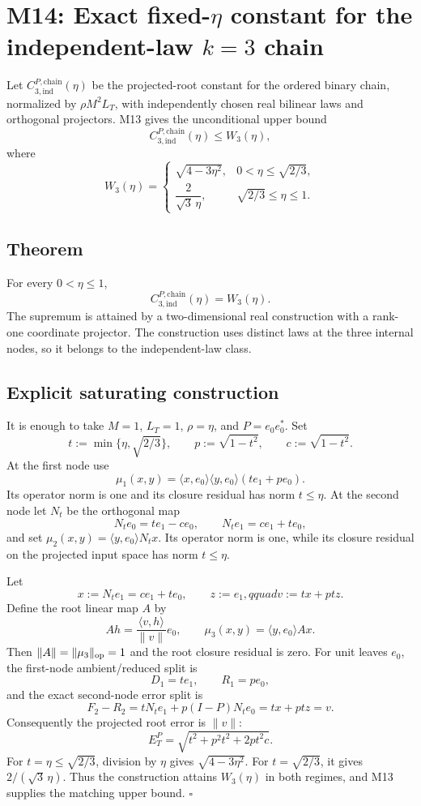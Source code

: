 \section*{M14: Exact fixed-$\eta$ constant for the independent-law $k=3$ chain}
\label{sec:m14-exact-chain}

Let $C_{3,\mathrm{ind}}^{P,\mathrm{chain}}(\eta)$ be the projected-root
constant for the ordered binary chain, normalized by $\rho M^2L_T$, with
independently chosen real bilinear laws and orthogonal projectors. M13 gives
the unconditional upper bound
\[
 C_{3,\mathrm{ind}}^{P,\mathrm{chain}}(\eta)\le W_3(\eta),
\]
where
\[
 W_3(\eta)=
 \begin{cases}
 \sqrt{4-3\eta^2},&0<\eta\le\sqrt{2/3},\\[1mm]
 \dfrac{2}{\sqrt3\,\eta},&\sqrt{2/3}\le\eta\le1.
 \end{cases}
\tag{M14.1}
\]

\subsection*{Theorem}

For every $0<\eta\le1$,
\[
 \boxed{C_{3,\mathrm{ind}}^{P,\mathrm{chain}}(\eta)=W_3(\eta).}
\tag{M14.2}
\]
The supremum is attained by a two-dimensional real construction with a
rank-one coordinate projector. The construction uses distinct laws at the
three internal nodes, so it belongs to the independent-law class.

\subsection*{Explicit saturating construction}

It is enough to take $M=1$, $L_T=1$, $\rho=\eta$, and
$P=e_0e_0^*$. Set
\[
 t:=\min\{\eta,\sqrt{2/3}\},\qquad
 p:=\sqrt{1-t^2},\qquad c:=\sqrt{1-t^2}.
\]
At the first node use
\[
 \mu_1(x,y)=\langle x,e_0\rangle\langle y,e_0\rangle
 (t e_1+p e_0).
\]
Its operator norm is one and its closure residual has norm $t\le\eta$.
At the second node let $N_t$ be the orthogonal map
\[
 N_t e_0=t e_1-c e_0,\qquad
 N_t e_1=c e_1+t e_0,
\]
and set $\mu_2(x,y)=\langle y,e_0\rangle N_t x$. Its operator norm is one,
while its closure residual on the projected input space has norm $t\le\eta$.

Let
\[
 x:=N_t e_1=c e_1+t e_0,\qquad
 z:=e_1,qquad
 v:=t x+p t z.
\]
Define the root linear map $A$ by
\[
 A h=\frac{\langle v,h\rangle}{\|v\|}e_0,
 \qquad \mu_3(x,y)=\langle y,e_0\rangle A x.
\]
Then $\|A\|=\|\mu_3\|_{\rm op}=1$ and the root closure residual is zero.
For unit leaves $e_0$, the first-node ambient/reduced split is
\[
 D_1=t e_1,\qquad R_1=p e_0,
\]
and the exact second-node error split is
\[
 F_2-R_2=tN_t e_1+p(I-P)N_t e_0=t x+p t z=v.
\]
Consequently the projected root error is $\|v\|$:
\[
 E_T^P=\sqrt{t^2+p^2t^2+2pt^2c}.
\tag{M14.3}
\]
For $t=\eta\le\sqrt{2/3}$, division by $\eta$ gives
$\sqrt{4-3\eta^2}$. For $t=\sqrt{2/3}$, it gives
$2/(\sqrt3\,\eta)$. Thus the construction attains $W_3(\eta)$ in both
regimes, and M13 supplies the matching upper bound. \hfill$\square$

